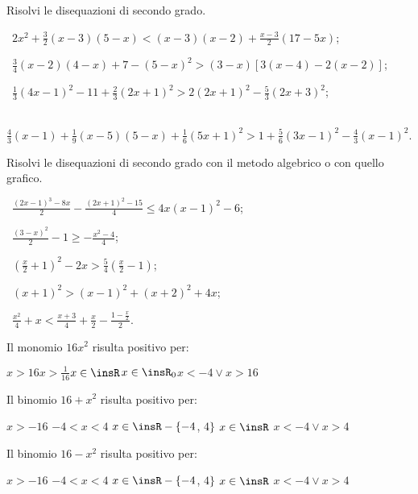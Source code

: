 \begin{esercizio}[\Ast]
\label{ese:4.18}
Risolvi le disequazioni di secondo grado.
 \begin{enumeratea}
 \item~$2x^{2}+\frac{3}{2}(x-3)(5-x)<(x-3)(x-2)+\frac{x-3}{2}(17-5x)$;
 \item~$\frac{3}{4}(x-2)(4-x)+7-(5-x)^{2}>(3-x)[3(x-4)-2(x-2)]$;
 \item~$\frac{1}{3}(4x-1)^{2}-11+\frac{2}{3}(2x+1)^{2}>2(2x+1)^{2}-\frac{5}{3}(2x+3)^{2}$;
 \item~$\frac{4}{3}(x-1)+\frac{1}{9}(x-5)(5-x)+\frac{1}{6}(5x+1)^{2}>1+\frac{5}{6}(3x-1)^{2}-\frac{4}{3}(x-1)^{2}$.
 \end{enumeratea}
\end{esercizio}

\begin{esercizio}[\Ast]
 \label{ese:4.19}
Risolvi le disequazioni di secondo grado con il metodo algebrico o con quello grafico.
 \begin{enumeratea}
 \item~$\frac{\left(2x-1\right)^3-8x} 2-\frac{\left(2x+1\right)^2-15} 4\le 4x\left(x-1\right)^2-6$;
 \item~$\frac{(3-x)^2} 2-1\ge -\frac{x^2-4} 4$;
 \item~$\left(\frac x 2+1\right)^2-2x>\frac 5 4\left(\frac x 2-1\right)$;
 \item~$(x+1)^2>(x-1)^2+(x+2)^2+4x$;
 \item~$\frac{x^2} 4+x<\frac{x+3} 4+\frac x 2-\frac{1-\frac x 2} 2$.
 \end{enumeratea}
\end{esercizio}

\begin{esercizio}
\label{ese:4.20}
Il monomio $16x^2$ risulta positivo per:

\boxA\quad $x>16$\qquad \boxB\quad $x>\frac 1{16}$\qquad\boxC\quad $x\in \insR$\qquad\boxD\quad $x\in \insR_0$\qquad\boxE\quad $x<-4\vee x>16$

\end{esercizio}

\begin{esercizio}
\label{ese:4.21}
Il binomio $16+x^2$ risulta positivo per:

\boxA\; $x>-16$\quad \boxB\; $-4<x<4$ \quad\boxC\; $x\in \insR-\{-4$, $4\}$ \quad\boxD\; $x\in \insR$ \quad\boxE\; $x<-4\vee x>4$
\end{esercizio}

\begin{esercizio}
\label{ese:4.22}
Il binomio $16-x^2$ risulta positivo per:

\boxA\; $x>-16$\quad \boxB\; $-4<x<4$ \quad\boxC\; $x\in \insR-\{-4$, $4\}$ \quad\boxD\; $x\in \insR$ \quad\boxE\; $x<-4\vee x>4$
\end{esercizio}

